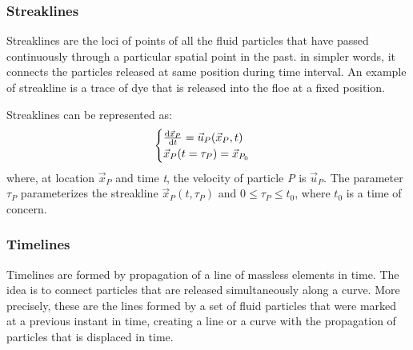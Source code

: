 \subsubsection{Streaklines}
Streaklines are the loci of points of all the fluid particles that have passed continuously through a particular spatial point in the past. in simpler words, it connects the particles released at same position during time interval. An example of streakline is a trace of dye that is released into the floe at a fixed position.

Streaklines can be represented as:
\begin{equation}
	\begin{cases}
		\frac{\mathop{}\!\mathrm{d} \vec{x}_{P}}{\mathop{}\!\mathrm{d} t} = \vec{u}_{P}(\vec{x}_{P},t) \\
		\vec{x}_{P}(t = \tau_{P}) = \vec{x}_{P_{0}}
	\end{cases}
\end{equation}
where, at location $\vec{x}_{P}$ and time \textit{t}, the velocity of particle \textit{P} is $ \vec{u}_{P} $. The parameter $\tau_{P}$ parameterizes the streakline $ \vec{x}_{P} (t, \tau_{P}) $ and $ 0 \leq \tau_{P} \leq t_{0} $, where $ t_{0}$ is a time of concern.

\subsubsection{Timelines}
Timelines are formed by propagation of a line of massless elements in time. The idea is to connect particles that are released simultaneously along a curve. More precisely, these are the lines formed by a set of fluid particles that were marked at a previous instant in time, creating a line or a curve with the propagation of particles that is displaced in time.

